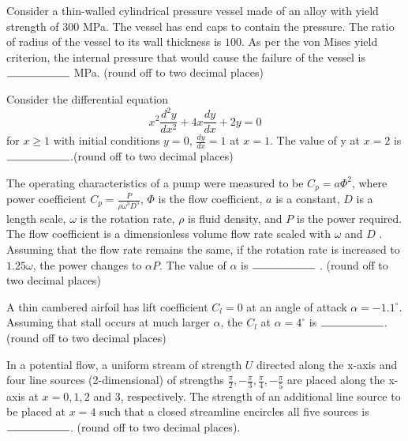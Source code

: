\iffalse
\title{GATE}
\author{EE}
\chapter{2023}
\section{AE}
\fi
	\item Consider a thin-walled cylindrical pressure vessel made of an alloy with yield strength of $300$ MPa. The vessel has end caps to contain the pressure. The ratio of radius of the vessel to its wall thickness is $100$. As per the von Mises yield criterion, the internal pressure that would cause the failure of the vessel is $\rule{2cm}{0.4pt}$ MPa. (round off to two decimal places)

	\item Consider the differential equation
		$$x^2\frac{d^2y}{dx^2}+4x\frac{dy}{dx}+2y=0$$
		for $x\geq 1$ with initial conditions $y=0$, $\frac{dy}{dx}=1$ at $x=1$. The value of y at $x=2$ is $\rule{2cm}{0.4pt}$.(round off to two decimal places)

	\item The operating characteristics of a pump were measured to be $C_p=a{\Phi}^2$, where power coefficient $C_p=\frac{P}{\rho{\omega}^3D^5}$, $\Phi$ is the flow coefficient, $a$ is a constant, $D$ is a length scale, $\omega$ is the rotation rate, $\rho$ is fluid density, and $P$ is the power required. The flow coefficient is a dimensionless volume flow rate scaled with $\omega$ and $D$ . Assuming that the flow rate remains the same, if the rotation rate is increased to $1.25\omega$, the power changes to $\alpha P$. The value of $\alpha$ is $\rule{2cm}{0.4pt}$ . (round off to two decimal places)

	\item A thin cambered airfoil has lift coefficient $C_l=0$ at an angle of attack $\alpha=-1.1^\circ$. Assuming that stall occurs at much larger $\alpha$, the $C_l$ at $\alpha=4^\circ$ is $\rule{2cm}{0.4pt}$. (round off to two decimal places)

	\item In a potential flow, a uniform stream of strength $ U $ directed along the x-axis and four line sources (2-dimensional) of strengths $\frac{\pi}{2}, -\frac{\pi}{3}, \frac{\pi}{4}, -\frac{\pi}{5}$ are placed along the x-axis at $ x = 0, 1, 2 $ and $ 3 $, respectively. The strength of an additional line source to be placed at $ x = 4 $ such that a closed streamline encircles all five sources is $\rule{2cm}{0.4pt}$. (round off to two decimal places).

